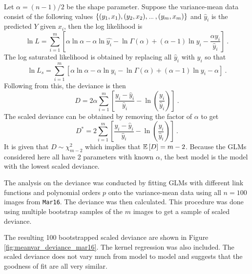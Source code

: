 Let $\alpha=(n-1)/2$ be the shape parameter. Suppose the variance-mean data consist of the following values $\{(y_1,x_1),(y_2,x_2),\dotdotdot,(y_m,x_m)\}$ and $\widehat{y}_i$ is the predicted $Y$ given $x_i$, then the log likelihood is
\begin{equation}
    \ln L = \sum_{i=1}^m \left[
        \alpha\ln\alpha
        -\alpha\ln \widehat{y_i}
        -\ln\Gamma(\alpha)
        +(\alpha-1)\ln y_i
        -\frac{\alpha y_i}{\widehat{y}_i}
    \right]
    \ .
\end{equation}
The log saturated likelihood is obtained by replacing all $\widehat{y}_i$ with $y_i$ so that
\begin{equation}
    \ln L_s = \sum_{i=1}^m \left[
        \alpha\ln\alpha
        -\alpha\ln{y_i}
        -\ln\Gamma(\alpha)
        +(\alpha-1)\ln y_i
        -\alpha
    \right]
    \ .
\end{equation}
Following from this, the deviance is then
\begin{equation}
    D = 2\alpha
    \sum_{i=1}^m\left[
        \dfrac{
            y_i-\widehat{y}_i
        }
        {
            \widehat{y}_i
        }
        - \ln\left(\dfrac{y_i}{\widehat{y}_i}\right)
    \right]
    \ .
\end{equation}
The scaled deviance can be obtained by removing the factor of $\alpha$ to get
\begin{equation}
    D^* = 2
    \sum_{i=1}^m\left[
        \dfrac{
            y_i-\widehat{y}_i
        }
        {
            \widehat{y}_i
        }
        - \ln\left(\dfrac{y_i}{\widehat{y}_i}\right)
    \right]
    \ .
\end{equation}
It is given that $D\sim\chi_{m-2}^2$ which implies that $\operatorname{\mathbb{E}}\left[D\right]=m-2$. Because the GLMs considered here all have 2 parameters with known $\alpha$, the best model is the model with the lowest scaled deviance.

The analysis on the deviance was conducted by fitting GLMs with different link functions and polynomial orders $p$ onto the variance-mean data using all $n=100$ images from \texttt{Mar16}. The deviance was then calculated. This procedure was done using multiple bootstrap samples \citep{efron1992bootstrap} of the $m$ images to get a sample of scaled deviance.

The resulting 100 bootstrapped scaled deviance are shown in Figure \ref{fig:meanvar_deviance_mar16}. The kernel regression was also included. The scaled deviance does not vary much from model to model and suggests that the goodness of fit are all very similar.

